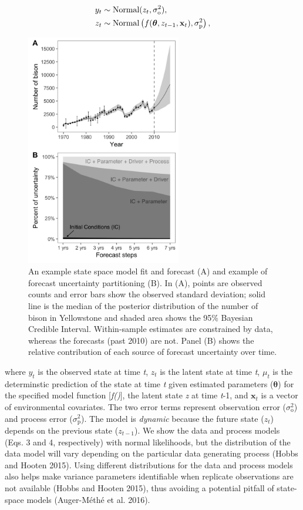 \documentclass[12pt,]{article}
\begin{document}
\begin{align}
y_t &\sim \text{Normal}(z_t, \sigma^2_{\text{o}}), \\
z_t &\sim \text{Normal}\left(f(\boldsymbol{\theta},z_{t-1},\bold{x}_t), \sigma^2_{\text{p}}\right),
\end{align}

\begin{figure}
  \centering
     \includegraphics[height=4in]{../figures/bison_combined.png}
  \caption{An example state space model fit and forecast (A) and example of forecast uncertainty partitioning (B). In (A), points are observed counts and error bars show the observed standard deviation; solid line is the median of the posterior distribution of the number of bison in Yellowstone and shaded area shows the 95\% Bayesian Credible Interval. Within-sample estimates are constrained by data, whereas the forecasts (past 2010) are not. Panel (B) shows the relative contribution of each source of forecast uncertainty over time.}
\end{figure}

where \(y_t\) is the observed state at time \emph{t}, \(z_t\) is the
latent state at time \emph{t}, \(\mu_t\) is the determinstic prediction
of the state at time \emph{t} given estimated parameters
(\(\boldsymbol{\theta}\)) for the specified model function
{[}\emph{f()}{]}, the latent state \emph{z} at time \emph{t}-1, and
\(\textbf{x}_t\) is a vector of environmental covariates. The two error
terms represent observation error (\(\sigma^2_{\text{o}}\)) and process
error (\(\sigma^2_{\text{p}}\)). The model is \emph{dynamic} because the
future state (\(z_t\)) depends on the previous state (\(z_{t-1}\)). We
show the data and process models (Eqs. 3 and 4, respectively) with
normal likelihoods, but the distribution of the data model will vary
depending on the particular data generating process (Hobbs and Hooten
2015). Using different distributions for the data and process models
also helps make variance parameters identifiable when replicate
observations are not available (Hobbs and Hooten 2015), thus avoiding a
potential pitfall of state-space models (Auger-Méthé et al. 2016).
\end{document}
